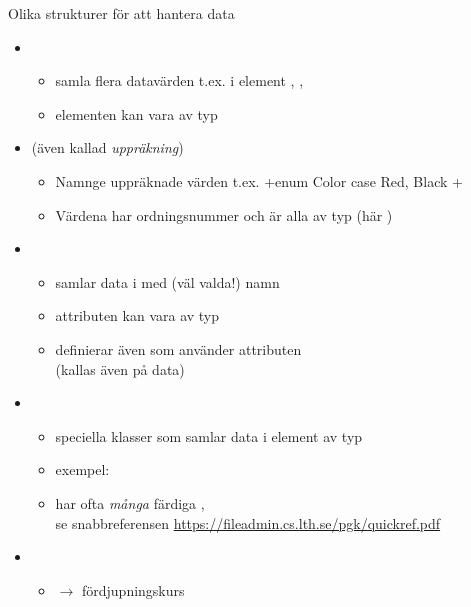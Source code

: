 \begin{Slide}{Olika strukturer för att hantera data}
\begin{itemize}\SlideFontSmall
\item {} 
\begin{itemize}\SlideFontTiny
\item samla flera datavärden t.ex.  i element , ,  
\item elementen kan vara av  typ
\end{itemize}
\item {} (även kallad \emph{uppräkning}) 
\begin{itemize}\SlideFontTiny
\item Namnge uppräknade värden t.ex. \code+enum Color { case Red, Black }+
\item Värdena har ordningsnummer och är alla av  typ (här )
\end{itemize}
\item {} 
\begin{itemize}\SlideFontTiny
\item samlar data i  med (väl valda!) namn
\item attributen kan vara av  typ
\item definierar även  som använder attributen \\ (kallas även  på data)
\end{itemize}

\item {}
  \begin{itemize}
  \item speciella klasser som samlar data i element av  typ
  \item exempel: 
  \item har ofta \emph{många} färdiga , \\ se snabbreferensen \url{https://fileadmin.cs.lth.se/pgk/quickref.pdf}
  \end{itemize}

\item {}
  \begin{itemize}
  \item $\rightarrow$ fördjupningskurs
  \end{itemize}

\end{itemize}
\end{Slide}






